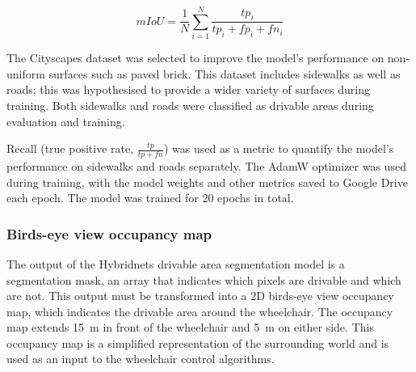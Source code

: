 \begin{equation}
mIoU = \frac{1}{N} \sum_{i=1}^{N} \frac{tp_i}{tp_i + fp_i + fn_i}
\label{eq:miou}
\end{equation}

The Cityscapes dataset was selected to improve the model's performance on non-uniform
surfaces such as paved brick. This dataset includes sidewalks as well as roads;
this was hypothesised to provide a wider variety of surfaces during training.
Both sidewalks and roads were classified as drivable areas during evaluation
and training.

Recall (true positive rate, $\frac{tp}{tp + fn}$) was used as a metric to quantify the model's
performance on sidewalks and roads separately.
The AdamW optimizer \cite{kingmaAdamMethodStochastic2014}\cite{loshchilovDecoupledWeightDecay2017} was
used during training, with the model weights and other metrics saved to Google Drive
each epoch. The model was trained for 20 epochs in total.


\subsubsection{Birds-eye view occupancy map}
\label{sec:birds_eye_view_occupancy_map}

The output of the Hybridnets drivable area segmentation model is a
segmentation mask, an array that indicates which pixels are drivable
and which are not.
This output must be transformed into a 2D birds-eye view occupancy map,
which indicates the drivable area around the wheelchair. The occupancy
map extends \SI{15}{\metre} in front of the wheelchair and \SI{5}{\metre} on either side.
This occupancy map is a simplified representation of the surrounding world
and is used as an input to the wheelchair control algorithms.

